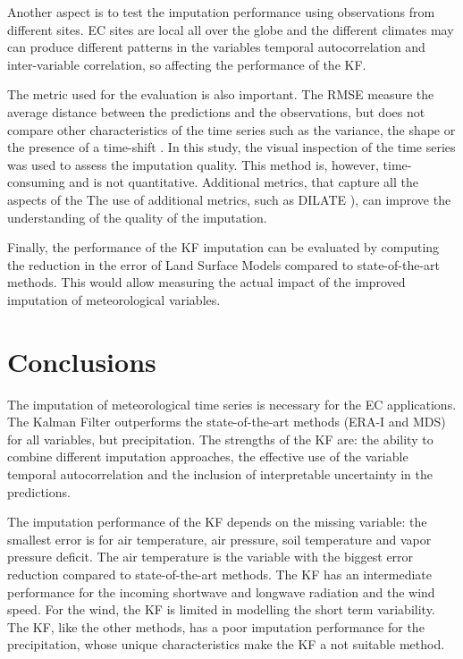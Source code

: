 \documentclass{article}
\let\Oldsection\section
\renewcommand{\section}{\FloatBarrier\Oldsection}
\begin{document}
Another aspect is to test the imputation performance using observations from different sites. EC sites are local all over the globe \cite{pastorello_fluxnet2015_2020} and the different climates may can produce different patterns in the variables temporal autocorrelation and inter-variable correlation, so affecting the performance of the KF.

The metric used for the evaluation is also important. The RMSE measure the average distance between the predictions and the observations, but does not compare other characteristics of the time series such as the variance, the shape or the presence of a time-shift \cite{guen_shape_nodate}. In this study, the visual inspection of the time series was used to assess the imputation quality. This method is, however, time-consuming and is not quantitative. Additional metrics, that capture all the aspects of the   The use of additional metrics, such as DILATE \cite{guen_shape_nodate}), can improve the understanding of the quality of the imputation.

Finally, the performance of the KF imputation can be evaluated by computing the reduction in the error of Land Surface Models compared to state-of-the-art methods. This would allow measuring the actual impact of the improved imputation of meteorological variables. 


\section{Conclusions}

The imputation of meteorological time series is necessary for the EC applications. The Kalman Filter outperforms the state-of-the-art methods (ERA-I and MDS) for all variables, but precipitation. The strengths of the KF are: the ability to combine different imputation approaches, the effective use of the variable temporal autocorrelation and the inclusion of interpretable uncertainty in the predictions. 

The imputation performance of the KF depends on the missing variable: the smallest error is for air temperature, air pressure, soil temperature and vapor pressure deficit. The air temperature is the variable with the biggest error reduction compared to state-of-the-art methods. The KF has an intermediate performance for the incoming shortwave and longwave radiation and the wind speed. For the wind, the KF is limited in modelling the short term variability. The KF, like the other methods, has a poor imputation performance for the precipitation, whose unique characteristics make the KF a not suitable method.
\end{document}

